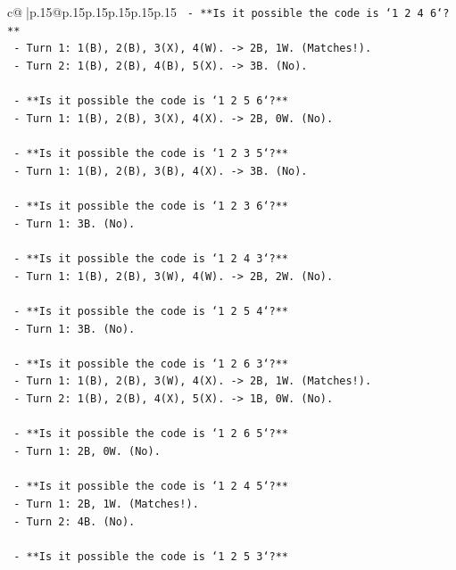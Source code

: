 \documentclass{article}
\begin{document}
{\begin{supertabular}{c@{$\;$}|p{.15\linewidth}@{}p{.15\linewidth}p{.15\linewidth}p{.15\linewidth}p{.15\linewidth}p{.15\linewidth}}
{{{\texttt{    {-} **Is it possible the code is `1 2 4 6`?**} \\
\texttt{        {-} Turn 1: 1(B), 2(B), 3(X), 4(W). {-}> 2B, 1W. (Matches!).} \\
\texttt{        {-} Turn 2: 1(B), 2(B), 4(B), 5(X). {-}> 3B. (No).} \\
\\ 
\texttt{    {-} **Is it possible the code is `1 2 5 6`?**} \\
\texttt{        {-} Turn 1: 1(B), 2(B), 3(X), 4(X). {-}> 2B, 0W. (No).} \\
\\ 
\texttt{    {-} **Is it possible the code is `1 2 3 5`?**} \\
\texttt{        {-} Turn 1: 1(B), 2(B), 3(B), 4(X). {-}> 3B. (No).} \\
\\ 
\texttt{    {-} **Is it possible the code is `1 2 3 6`?**} \\
\texttt{        {-} Turn 1: 3B. (No).} \\
\\ 
\texttt{    {-} **Is it possible the code is `1 2 4 3`?**} \\
\texttt{        {-} Turn 1: 1(B), 2(B), 3(W), 4(W). {-}> 2B, 2W. (No).} \\
\\ 
\texttt{    {-} **Is it possible the code is `1 2 5 4`?**} \\
\texttt{        {-} Turn 1: 3B. (No).} \\
\\ 
\texttt{    {-} **Is it possible the code is `1 2 6 3`?**} \\
\texttt{        {-} Turn 1: 1(B), 2(B), 3(W), 4(X). {-}> 2B, 1W. (Matches!).} \\
\texttt{        {-} Turn 2: 1(B), 2(B), 4(X), 5(X). {-}> 1B, 0W. (No).} \\
\\ 
\texttt{    {-} **Is it possible the code is `1 2 6 5`?**} \\
\texttt{        {-} Turn 1: 2B, 0W. (No).} \\
\\ 
\texttt{    {-} **Is it possible the code is `1 2 4 5`?**} \\
\texttt{        {-} Turn 1: 2B, 1W. (Matches!).} \\
\texttt{        {-} Turn 2: 4B. (No).} \\
\\ 
\texttt{    {-} **Is it possible the code is `1 2 5 3`?**} \\
}}}
\end{supertabular}}
\end{document}
